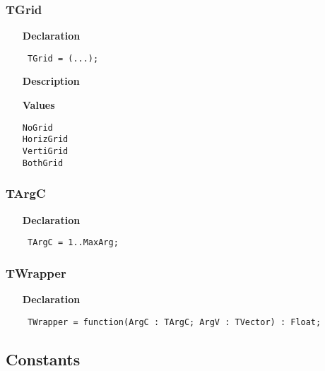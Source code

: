 \documentclass[12pt,a4paper,oneside]{report}
\newcommand{\declarationitem}[1]{\textbf{#1}}
\newcommand{\descriptiontitle}[1]{\textbf{#1}}
\newcommand{\code}[1]{\texttt{#1}}
\begin{document}
\subsubsection{TGrid}
\label{utypes-TGrid}
\begin{itemize}\item[\declarationitem{Declaration}\hfill]
	\begin{flushleft}
		\code{
			TGrid = (...);}
	\end{flushleft}
	\item[\descriptiontitle{Description}]
	\item[\textbf{Values}]
	\begin{description}
		\item[\texttt{NoGrid}]  
		\item[\texttt{HorizGrid}]  
		\item[\texttt{VertiGrid}]  
		\item[\texttt{BothGrid}]  
	\end{description}
\end{itemize}

\subsubsection{TArgC}
\label{utypes-TArgC}
\begin{itemize}\item[\declarationitem{Declaration}\hfill]
	\begin{flushleft}
		\code{
			TArgC = 1..MaxArg;}
	\end{flushleft}
\end{itemize}

\subsubsection{TWrapper}
\label{utypes-TWrapper}
\begin{itemize}\item[\declarationitem{Declaration}\hfill]
	\begin{flushleft}
		\code{
			TWrapper = function(ArgC : TArgC; ArgV : TVector) : Float;}
	\end{flushleft}
\end{itemize}

\subsection{Constants}
\end{document}

